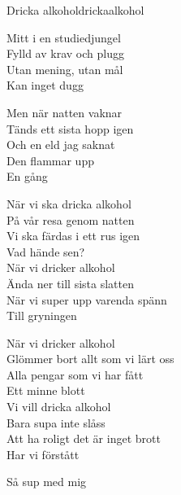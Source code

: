 \begin{song}{Dricka alkohol}{drickaalkohol}
\begin{vers}
Mitt i en studiedjungel\\
Fylld av krav och plugg\\
Utan mening, utan mål\\
Kan inget dugg\\
\end{vers}
\begin{vers}
Men när natten vaknar\\
Tänds ett sista hopp igen\\
Och en eld jag saknat\\
Den flammar upp\\
En gång\\
\end{vers}
\begin{vers}
När vi ska dricka alkohol\\
På vår resa genom natten\\
Vi ska färdas i ett rus igen\\
Vad hände sen?\\
När vi dricker alkohol\\
Ända ner till sista slatten\\
När vi super upp varenda spänn\\
Till gryningen\\
\end{vers}
\begin{vers}
När vi dricker alkohol\\
Glömmer bort allt som vi lärt oss\\
Alla pengar som vi har fått\\
Ett minne blott\\
Vi vill dricka alkohol\\
Bara supa inte slåss\\
Att ha roligt det är inget brott\\
Har vi förstått\\
\end{vers}
\begin{vers}
Så sup med mig\\
\end{vers}
\end{song}
